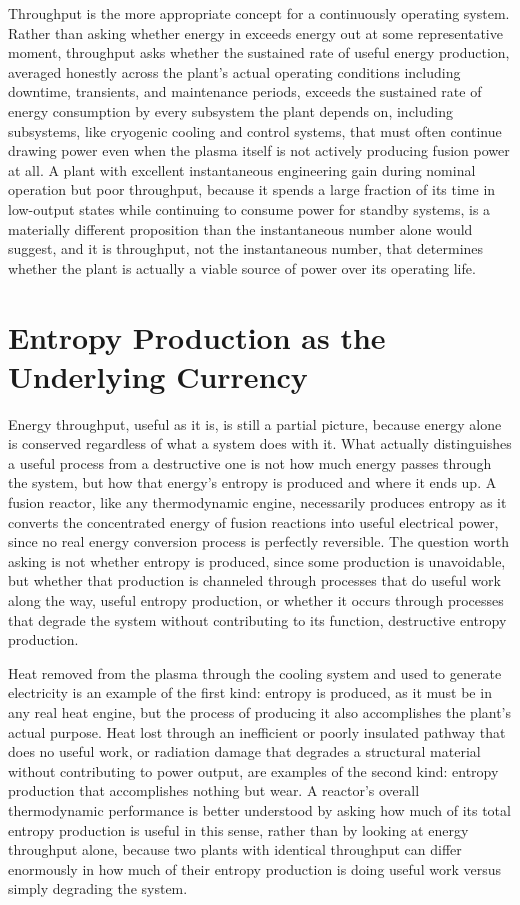 Throughput is the more appropriate concept for a continuously operating system. Rather than asking whether energy in exceeds energy out at some representative moment, throughput asks whether the sustained rate of useful energy production, averaged honestly across the plant's actual operating conditions including downtime, transients, and maintenance periods, exceeds the sustained rate of energy consumption by every subsystem the plant depends on, including subsystems, like cryogenic cooling and control systems, that must often continue drawing power even when the plasma itself is not actively producing fusion power at all. A plant with excellent instantaneous engineering gain during nominal operation but poor throughput, because it spends a large fraction of its time in low-output states while continuing to consume power for standby systems, is a materially different proposition than the instantaneous number alone would suggest, and it is throughput, not the instantaneous number, that determines whether the plant is actually a viable source of power over its operating life.

\section{Entropy Production as the Underlying Currency}

Energy throughput, useful as it is, is still a partial picture, because energy alone is conserved regardless of what a system does with it. What actually distinguishes a useful process from a destructive one is not how much energy passes through the system, but how that energy's entropy is produced and where it ends up. A fusion reactor, like any thermodynamic engine, necessarily produces entropy as it converts the concentrated energy of fusion reactions into useful electrical power, since no real energy conversion process is perfectly reversible. The question worth asking is not whether entropy is produced, since some production is unavoidable, but whether that production is channeled through processes that do useful work along the way, useful entropy production, or whether it occurs through processes that degrade the system without contributing to its function, destructive entropy production.

Heat removed from the plasma through the cooling system and used to generate electricity is an example of the first kind: entropy is produced, as it must be in any real heat engine, but the process of producing it also accomplishes the plant's actual purpose. Heat lost through an inefficient or poorly insulated pathway that does no useful work, or radiation damage that degrades a structural material without contributing to power output, are examples of the second kind: entropy production that accomplishes nothing but wear. A reactor's overall thermodynamic performance is better understood by asking how much of its total entropy production is useful in this sense, rather than by looking at energy throughput alone, because two plants with identical throughput can differ enormously in how much of their entropy production is doing useful work versus simply degrading the system.

